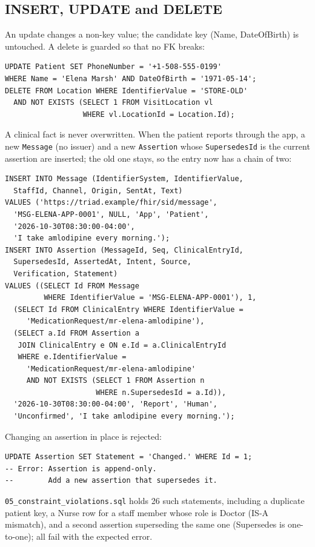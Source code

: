 \documentclass[sigconf]{acmart}
\begin{document}
\subsection{INSERT, UPDATE and DELETE}
An update changes a non-key value; the candidate key (Name, DateOfBirth) is untouched. A delete is guarded so that no FK breaks:
\par\noindent\begin{minipage}{\columnwidth}\begin{lstlisting}
UPDATE Patient SET PhoneNumber = '+1-508-555-0199'
WHERE Name = 'Elena Marsh' AND DateOfBirth = '1971-05-14';
DELETE FROM Location WHERE IdentifierValue = 'STORE-OLD'
  AND NOT EXISTS (SELECT 1 FROM VisitLocation vl
                  WHERE vl.LocationId = Location.Id);
\end{lstlisting}\end{minipage}\par
A clinical fact is never overwritten. When the patient reports through the app, a new \texttt{Message} (no issuer) and a new \texttt{Assertion} whose \texttt{SupersedesId} is the current assertion are inserted; the old one stays, so the entry now has a chain of two:
\par\noindent\begin{minipage}{\columnwidth}\begin{lstlisting}
INSERT INTO Message (IdentifierSystem, IdentifierValue,
  StaffId, Channel, Origin, SentAt, Text)
VALUES ('https://triad.example/fhir/sid/message',
  'MSG-ELENA-APP-0001', NULL, 'App', 'Patient',
  '2026-10-30T08:30:00-04:00',
  'I take amlodipine every morning.');
INSERT INTO Assertion (MessageId, Seq, ClinicalEntryId,
  SupersedesId, AssertedAt, Intent, Source,
  Verification, Statement)
VALUES ((SELECT Id FROM Message
         WHERE IdentifierValue = 'MSG-ELENA-APP-0001'), 1,
  (SELECT Id FROM ClinicalEntry WHERE IdentifierValue =
     'MedicationRequest/mr-elena-amlodipine'),
  (SELECT a.Id FROM Assertion a
   JOIN ClinicalEntry e ON e.Id = a.ClinicalEntryId
   WHERE e.IdentifierValue =
     'MedicationRequest/mr-elena-amlodipine'
     AND NOT EXISTS (SELECT 1 FROM Assertion n
                     WHERE n.SupersedesId = a.Id)),
  '2026-10-30T08:30:00-04:00', 'Report', 'Human',
  'Unconfirmed', 'I take amlodipine every morning.');
\end{lstlisting}\end{minipage}\par
Changing an assertion in place is rejected:
\par\noindent\begin{minipage}{\columnwidth}\begin{lstlisting}
UPDATE Assertion SET Statement = 'Changed.' WHERE Id = 1;
-- Error: Assertion is append-only.
--        Add a new assertion that supersedes it.
\end{lstlisting}\end{minipage}\par
\texttt{05\_constraint\_violations.sql} holds 26 such statements, including a duplicate patient key, a Nurse row for a staff member whose role is Doctor (IS-A mismatch), and a second assertion superseding the same one (Supersedes is one-to-one); all fail with the expected error.
\end{document}
